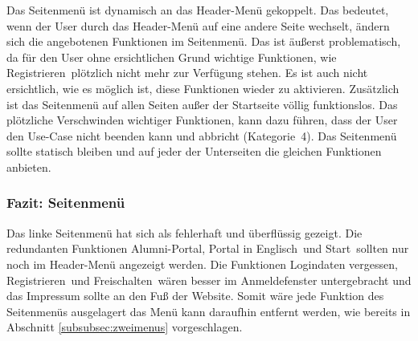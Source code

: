 {Das Seitenmenü ist dynamisch an das Header-Menü gekoppelt. Das bedeutet, wenn der User durch das Header-Menü auf eine andere Seite wechselt, ändern sich die angebotenen Funktionen im Seitenmenü. Das ist äußerst problematisch, da für den User ohne ersichtlichen Grund wichtige Funktionen, wie \glqq Registrieren\grqq~plötzlich nicht mehr zur Verfügung stehen. Es ist auch nicht ersichtlich, wie es möglich ist, diese Funktionen wieder zu aktivieren.
Zusätzlich ist das Seitenmenü auf allen Seiten außer der Startseite völlig funktionslos. 
}
{Das plötzliche Verschwinden wichtiger Funktionen, kann dazu führen, dass der User den Use-Case nicht beenden kann und abbricht (Kategorie~4).
}
{Das Seitenmenü sollte statisch bleiben und auf jeder der Unterseiten die gleichen Funktionen anbieten.
}

\subsubsection*{Fazit: Seitenmenü}
Das linke Seitenmenü hat sich als fehlerhaft und überflüssig gezeigt. 
Die redundanten Funktionen \glqq Alumni-Portal\grqq, \glqq Portal in Englisch\grqq~und \glqq Start\grqq~sollten nur noch im Header-Menü angezeigt werden. Die Funktionen \glqq Logindaten vergessen\grqq, \glqq Registrieren\grqq~und \glqq Freischalten\grqq~wären besser im Anmeldefenster untergebracht und das Impressum sollte an den Fuß der Website.
Somit wäre jede Funktion des Seitenmenüs ausgelagert das Menü kann daraufhin entfernt werden, wie bereits in Abschnitt \ref{subsubsec:zweimenus} vorgeschlagen.
